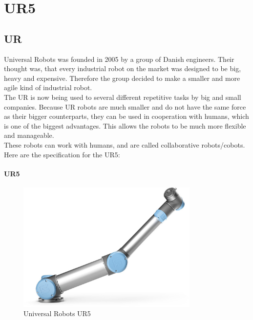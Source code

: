 \chapter{UR5}

\section{UR}

Universal Robots was founded in 2005 by a group of Danish engineers. Their thought was, that every industrial robot on the market was designed to be big, heavy and expensive. Therefore the group decided to make a smaller and more agile kind of industrial robot.\cite{Urhist}\\


The UR is now being used to several different repetitive tasks by big and small companies.
Because UR robots are much smaller and do not have the same force as their bigger counterparts, they can be used in cooperation with humans, which is one of the biggest advantages. This allows the robots to be much more flexible and manageable.\\



These robots can work with humans, and are called collaborative robots/cobots.\\
Here are the specification for the UR5:\\ 

\subsubsection{UR5}

\begin{figure}[h!]
    \centering
    \includegraphics[width=9cm]{UR/UR5pic.jpg}
    \caption{Universal Robots UR5 \cite{UR5billede}}
    \label{fig:UR5}
\end{figure}

